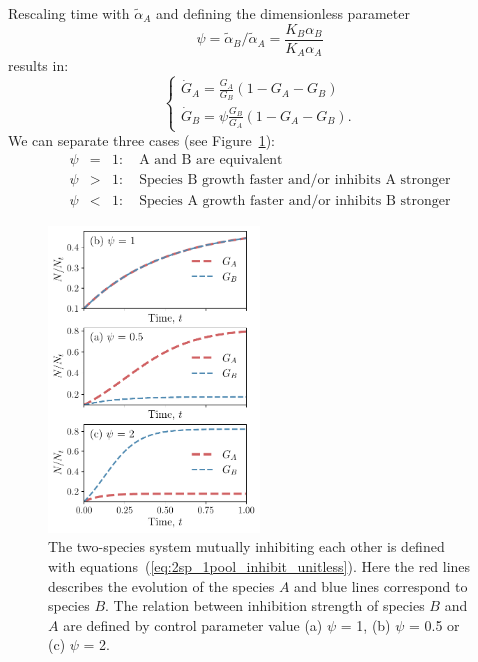\documentclass[10pt,A4paper]{article}
\begin{document}
Rescaling time with $\tilde{\alpha}_A$ and defining the dimensionless parameter
\begin{equation}
    \psi = \tilde{\alpha}_B/\tilde{\alpha}_A = \frac{K_B\alpha_B}{K_A\alpha_A}
\end{equation}
results in: 
\begin{equation}
    \begin{cases}
    \dot{G}_A =\frac{G_A}{G_B}\left(1 - G_A-G_B\right)\\
    \dot{G}_B =\psi\frac{G_B}{G_A}\left(1-G_A-G_B\right). 
    \end{cases}
    \label{eq:2sp_1pool_inhibit_unitless}
\end{equation}
We can separate three cases (see Figure~\ref{fig:1pool_2sp_inhibit}):
\begin{eqnarray}
    \psi&=&1:\quad\text{A and B are equivalent}\\
    \psi&>&1:\quad\text{Species B growth faster and/or inhibits A stronger}\\
    \psi&<&1:\quad\text{Species A growth faster and/or inhibits B stronger}
\end{eqnarray}
%
\begin{figure}[H]
    \begin{center}
    \includegraphics[width=0.5\textwidth]{Figures/pool_model_1pool_inhib.pdf}
    \caption{
        The two-species system mutually inhibiting each other is defined with equations~(\ref{eq:2sp_1pool_inhibit_unitless}).
        Here the red lines describes the evolution of the species $A$ and blue lines correspond to species $B$.
        The relation between inhibition strength of species $B$ and $A$ are defined by control parameter value (a) $\psi$ = 1, (b) $\psi$ = 0.5 or (c) $\psi$ = 2.
    }
    \label{fig:1pool_2sp_inhibit}
    \end{center}
\end{figure}
%
%
%
\end{document}

